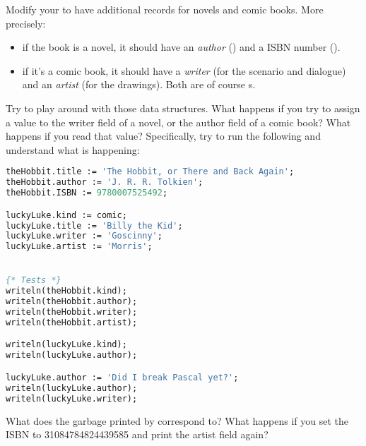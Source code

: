 \documentclass{../../tp}
\begin{document}
\begin{instruction}
Modify your  to have additional records for novels and comic books. More precisely:
	\begin{itemize}
		\item if the book is a novel, it should have an \emph{author} () and a ISBN number ().
		\item if it's a comic book, it should have a \emph{writer} (for the scenario and dialogue) and an \emph{artist} (for the drawings). Both are of course s.
	\end{itemize} 
	
	Try to play around with those data structures. What happens if you try to assign a value to the writer field of a novel, or the author field of a comic book? What happens if you read that value?
	Specifically, try to run the following and understand what is happening:
	
\begin{lstlisting}[language=Pascal]
theHobbit.title := 'The Hobbit, or There and Back Again';
theHobbit.author := 'J. R. R. Tolkien';
theHobbit.ISBN := 9780007525492;

luckyLuke.kind := comic;
luckyLuke.title := 'Billy the Kid';
luckyLuke.writer := 'Goscinny';
luckyLuke.artist := 'Morris';


{* Tests *}
writeln(theHobbit.kind);
writeln(theHobbit.author);
writeln(theHobbit.writer);
writeln(theHobbit.artist);

writeln(luckyLuke.kind);        
writeln(luckyLuke.author);

luckyLuke.author := 'Did I break Pascal yet?';
writeln(luckyLuke.author);
writeln(luckyLuke.writer);

\end{lstlisting}

	What does the garbage printed by  correspond to?
	What happens if you set the ISBN to 31084784824439585 and print the artist field again? 
\end{instruction}
\end{document}
